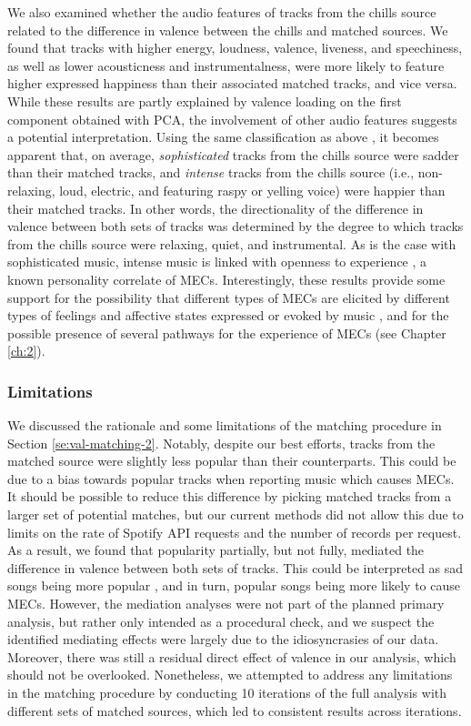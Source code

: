 We also examined whether the audio features of tracks from the chills source related to the difference in valence between the chills and matched sources. We found that tracks with higher energy, loudness, valence, liveness, and speechiness, as well as lower acousticness and instrumentalness, were more likely to feature higher expressed happiness than their associated matched tracks, and vice versa. While these results are partly explained by valence loading on the first component obtained with PCA, the involvement of other audio features suggests a potential interpretation. Using the same classification as above \parencite{rentfrow2012}, it becomes apparent that, on average, \emph{sophisticated} tracks from the chills source were sadder than their matched tracks, and \emph{intense} tracks from the chills source (i.e., non-relaxing, loud, electric, and featuring raspy or yelling voice) were happier than their matched tracks. In other words, the directionality of the difference in valence between both sets of tracks was determined by the degree to which tracks from the chills source were relaxing, quiet, and instrumental. As is the case with sophisticated music, intense music is linked with openness to experience \parencite{schafer2017}, a known personality correlate of MECs. Interestingly, these results provide some support for the possibility that different types of MECs are elicited by different types of feelings and affective states expressed or evoked by music \parencite{bannister2019, maruskin2012}, and for the possible presence of several pathways for the experience of MECs (see Chapter \ref{ch:2}).

\subsubsection{Limitations}

We discussed the rationale and some limitations of the matching procedure in Section \ref{se:val-matching-2}. Notably, despite our best efforts, tracks from the matched source were slightly less popular than their counterparts. This could be due to a bias towards popular tracks when reporting music which causes MECs. It should be possible to reduce this difference by picking matched tracks from a larger set of potential matches, but our current methods did not allow this due to limits on the rate of Spotify API requests and the number of records per request. As a result, we found that popularity partially, but not fully, mediated the difference in valence between both sets of tracks. This could be interpreted as sad songs being more popular \parencite[see][]{gulmatico2022}, and in turn, popular songs being more likely to cause MECs. However, the mediation analyses were not part of the planned primary analysis, but rather only intended as a procedural check, and we suspect the identified mediating effects were largely due to the idiosyncrasies of our data. Moreover, there was still a residual direct effect of valence in our analysis, which should not be overlooked. Nonetheless, we attempted to address any limitations in the matching procedure by conducting 10 iterations of the full analysis with different sets of matched sources, which led to consistent results across iterations.

